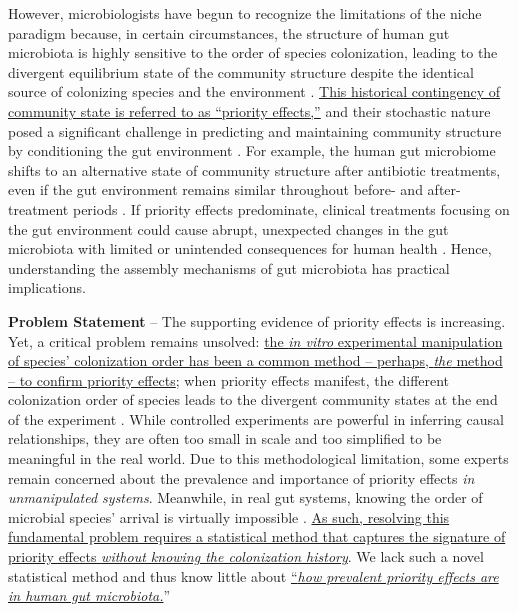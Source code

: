 \documentclass[12pt, class=article, crop=false]{standalone}
\begin{document}
However, microbiologists have begun to recognize the limitations of the niche paradigm because, in certain circumstances, the structure of human gut microbiota is highly sensitive to the order of species colonization, leading to the divergent equilibrium state of the community structure despite the identical source of colonizing species and the environment \citep{fierer_animalcules_2012, david_host_2014, akagawa_effect_2019, ojima_priority_2022, debray_priority_2022}.
\ul{This historical contingency of community state is referred to as ``priority effects,''} and their stochastic nature posed a significant challenge in predicting and maintaining community structure by conditioning the gut environment \citep{fukami_historical_2015}.
For example, the human gut microbiome shifts to an alternative state of community structure after antibiotic treatments, even if the gut environment remains similar throughout before- and after-treatment periods \citep{dethlefsen_incomplete_2011}.
If priority effects predominate, clinical treatments focusing on the gut environment could cause abrupt, unexpected changes in the gut microbiota \citep{chase_community_2003, chase_stochastic_2010, fukami_historical_2015} with limited or unintended consequences for human health \citep{sprockett_role_2018}. 
Hence, understanding the assembly mechanisms of gut microbiota has practical implications.

\textbf{Problem Statement} --
The supporting evidence of priority effects is increasing.
Yet, a critical problem remains unsolved: \ul{the \textit{in vitro} experimental manipulation of species' colonization order has been a common method -- perhaps, \textit{the} method -- to confirm priority effects}; when priority effects manifest, the different colonization order of species leads to the divergent community states at the end of the experiment \citep{fukami_historical_2015, sprockett_role_2018}.
While controlled experiments are powerful in inferring causal relationships, they are often too small in scale and too simplified to be meaningful in the real world.
Due to this methodological limitation, some experts remain concerned about the prevalence and importance of priority effects \textit{in unmanipulated systems}.
Meanwhile, in real gut systems, knowing the order of microbial species' arrival is virtually impossible \citep{sprockett_role_2018}.
\ul{As such, resolving this fundamental problem requires a statistical method that captures the signature of priority effects \textit{without knowing the colonization history}}.
We lack such a novel statistical method and thus know little about \ul{``\textit{how prevalent priority effects are in human gut microbiota.}}'' 
\end{document}
